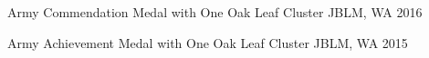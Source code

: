 




\begin{cvhonors}

\cvhonor
    {Army Commendation Medal} %
    {with One Oak Leaf Cluster} %
    {JBLM, WA} %
    {2016} %

 
\cvhonor
    {Army Achievement Medal} %
    {with One Oak Leaf Cluster} %
    {JBLM, WA} %
    {2015} %


\end{cvhonors}
